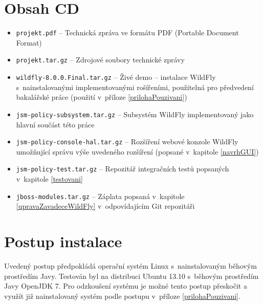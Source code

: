 \chapter{Obsah CD}

\begin{itemize}
  \item {\tt projekt.pdf} -- Technická zpráva ve formátu PDF (Portable Document Format)
  \item {\tt projekt.tar.gz} -- Zdrojové soubory technické zprávy

  \item {\tt wildfly-8.0.0.Final.tar.gz} -- Živé demo -- instalace WildFly s~nainstalovanými implementovanými rošířeními, použitelná pro předvedení bakalářské práce (použití v~příloze \ref{prilohaPouzivani})

  \item {\tt jsm-policy-subsystem.tar.gz} -- Subsystém WildFly implementovaný jako hlavní součást této práce
  \item {\tt jsm-policy-console-hal.tar.gz} -- Rozšíření webové konzole WildFly umožňující správu výše uvedeného rozšíření (popsané v~kapitole \ref{navrhGUI})
  \item {\tt jsm-policy-test.tar.gz} -- Repozitář integračních testů popsaných v~kapitole \ref{testovani}

  \item {\tt jboss-modules.tar.gz} -- Záplata popsaná v~kapitole \ref{upravaZavadeceWildFly} v~odpovídajícím Git repozitáři
\end{itemize}


\chapter{Postup instalace}\label{prilohaInstalace}

Uvedený postup předpokládá operační systém Linux s~nainstalovaným běhovým prostředím Javy. Testován byl na distribuci Ubuntu 13.10 s~běhovým prostředím Javy OpenJDK 7. Pro odzkoušení systému je možné tento postup přeskočit a využít již nainstalovaný systém podle postupu v~příloze \ref{prilohaPouzivani}.

